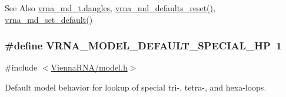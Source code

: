 \begin{DoxySeeAlso}{See Also}
\hyperlink{group__model__details_adcda4ff2ea77748ae0e8700288282efc}{vrna\-\_\-md\-\_\-t.\-dangles}, \hyperlink{group__model__details_ga70834424cf804d149937de89f80ceb45}{vrna\-\_\-md\-\_\-defaults\-\_\-reset()}, \hyperlink{group__model__details_ga8ac6ff84936282436f822644bf841f66}{vrna\-\_\-md\-\_\-set\-\_\-default()} 
\end{DoxySeeAlso}
\hypertarget{group__model__details_gabd1ab224e1048defd45c165ed7d1c108}{
\subsubsection[{V\-R\-N\-A\-\_\-\-M\-O\-D\-E\-L\-\_\-\-D\-E\-F\-A\-U\-L\-T\-\_\-\-S\-P\-E\-C\-I\-A\-L\-\_\-\-H\-P}]{\setlength{\rightskip}{0pt plus 5cm}\#define V\-R\-N\-A\-\_\-\-M\-O\-D\-E\-L\-\_\-\-D\-E\-F\-A\-U\-L\-T\-\_\-\-S\-P\-E\-C\-I\-A\-L\-\_\-\-H\-P~1}}\label{group__model__details_gabd1ab224e1048defd45c165ed7d1c108}


{\ttfamily \#include $<$\hyperlink{model_8h}{Vienna\-R\-N\-A/model.\-h}$>$}



Default model behavior for lookup of special tri-\/, tetra-\/, and hexa-\/loops. 

